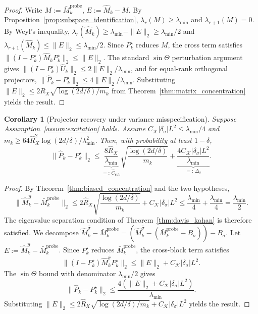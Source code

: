 \documentclass[12pt]{article}
\newtheorem{corollary}{Corollary}
\theoremstyle{plain}
\theoremstyle{definition}
\begin{document}
\begin{proof}
Write $M := \bar{M}_k^{\mathrm{probe}}$, $E := \widehat{M}_k - M$. By Proposition~\ref{prop:subspace_identification}, $\lambda_r(M) \ge \lambda_{\min}$ and $\lambda_{r+1}(M) = 0$. By Weyl's inequality, $\lambda_r(\widehat{M}_k) \ge \lambda_{\min} - \|E\|_2 \ge \lambda_{\min}/2$ and $\lambda_{r+1}(\widehat{M}_k) \le \|E\|_2 \le \lambda_{\min}/2$. Since $P_k^\star$ reduces $M$, the cross term satisfies $\|(I - P_k^\star)\widehat{M}_k P_k^\star\|_2 \le \|E\|_2$. The standard $\sin\Theta$ perturbation argument \citep{davis1970rotation, yu2015useful} gives $\|(I - P_k^\star)\widehat{U}_k\|_2 \le 2\|E\|_2 / \lambda_{\min}$, and for equal-rank orthogonal projectors, $\|\widehat{P}_k - P_k^\star\|_2 \le 4\|E\|_2 / \lambda_{\min}$. Substituting $\|E\|_2 \le 2R_X\sqrt{\log(2d/\delta)/m_k}$ from Theorem~\ref{thm:matrix_concentration} yields the result.
\end{proof}

\begin{corollary}[Projector recovery under variance misspecification]
\label{cor:projector_misspec}
Suppose Assumption~\ref{assum:excitation} holds. Assume $C_{\mathcal{K}} |\delta_\sigma| L^2 \le \lambda_{\min}/4$ and $m_k \ge 64\hat{R}_X^2 \log(2d/\delta) / \lambda_{\min}^2$. Then, with probability at least $1 - \delta$,
\begin{equation}
\|\widehat{P}_k - P_k^\star\|_2
\le
\underbrace{\frac{8\hat{R}_X}{\lambda_{\min}}}_{=:\, \hat{C}_{\mathrm{sub}}}
\sqrt{\frac{\log(2d/\delta)}{m_k}}
+
\underbrace{\frac{4C_{\mathcal{K}} |\delta_\sigma| L^2}{\lambda_{\min}}}_{=:\, \Delta_\sigma}.
\label{eq:projector_misspec}
\end{equation}
\end{corollary}

\begin{proof}
By Theorem~\ref{thm:biased_concentration} and the two hypotheses,
\[
\|\widehat{M}_k^{\hat\sigma} - \bar{M}_k^{\mathrm{probe}}\|_2
\le 2\hat{R}_X\sqrt{\frac{\log(2d/\delta)}{m_k}} + C_{\mathcal{K}} |\delta_\sigma| L^2
\le \frac{\lambda_{\min}}{4} + \frac{\lambda_{\min}}{4} = \frac{\lambda_{\min}}{2}.
\]
The eigenvalue separation condition of Theorem~\ref{thm:davis_kahan} is therefore satisfied. We decompose $\widehat{M}_k^{\hat\sigma} - \bar{M}_k^{\mathrm{probe}} = (\widehat{M}_k^{\hat\sigma} - (\bar{M}_k^{\mathrm{probe}} - B_\sigma)) - B_\sigma$. Let $E := \widehat{M}_k^{\hat\sigma} - \bar{M}_k^{\mathrm{probe}}$. Since $P_k^\star$ reduces $\bar{M}_k^{\mathrm{probe}}$, the cross-block term satisfies
\[
\|(I - P_k^\star)\widehat{M}_k^{\hat\sigma} P_k^\star\|_2 \le \|E\|_2 + C_{\mathcal{K}} |\delta_\sigma| L^2.
\]
The $\sin\Theta$ bound with denominator $\lambda_{\min}/2$ gives
\[
\|\widehat{P}_k - P_k^\star\|_2
\le \frac{4(\|E\|_2 + C_{\mathcal{K}} |\delta_\sigma| L^2)}{\lambda_{\min}}.
\]
Substituting $\|E\|_2 \le 2\hat{R}_X\sqrt{\log(2d/\delta)/m_k} + C_{\mathcal{K}} |\delta_\sigma| L^2$ yields the result.
\end{proof}
\end{document}
